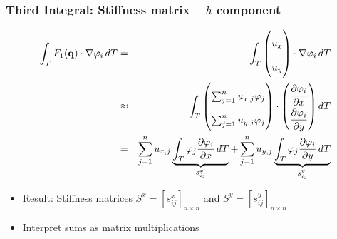 \documentclass{beamer}
\newcommand{\pd}[2]{\dfrac{\partial #1}{\partial #2}}
\renewcommand{\phi}{\varphi}
\begin{document}
\begin{frame}
  \frametitle{Third Integral: Stiffness matrix -- $h$ component}
  \begin{eqnarray*}
    \int_T F_1(\mathbf{q}) \cdot \nabla \phi_i \, dT & = &
    \int_T
    \begin{pmatrix}
      u_x \\ u_y
    \end{pmatrix}
    \cdot \nabla \phi_i \, dT \\
    & \approx & \int_T 
    \begin{pmatrix} 
      \sum_{j=1}^n u_{x,j} \phi_j \\
      \sum_{j=1}^n u_{y,j} \phi_j \\
    \end{pmatrix}
    \cdot 
    {
      \renewcommand\arraystretch{2}
      \begin{pmatrix}
        \pd{\phi_i}{x} \\
        \pd{\phi_i}{y} 
      \end{pmatrix} dT 
    }\\
    & = & \sum_{j=1}^n u_{x,j} \underbrace{\int_T \phi_j \pd{\phi_i}{x} \, dT}_{s^x_{ij}} + \sum_{j=1}^n u_{y,j} \underbrace{\int_T \phi_j \pd{\phi_i}{y} \, dT}_{s^y_{ij}}
  \end{eqnarray*}
  \begin{itemize}
  \item Result: Stiffness matrices $S^x = [s_{ij}^x]_{n \times n}$ and $S^y = [s_{ij}^y]_{n \times n}$
  \item Interpret sums as matrix multiplications
  \end{itemize}
\end{frame}
\end{document}
